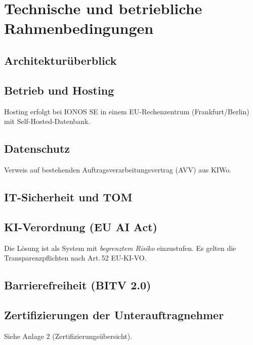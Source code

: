\chapter{Technische und betriebliche Rahmenbedingungen}

\section{Architekturüberblick}


\section{Betrieb und Hosting}

Hosting erfolgt bei IONOS SE in einem EU-Rechenzentrum (Frankfurt/Berlin)
mit Self-Hosted-Datenbank. 

\section{Datenschutz}

Verweis auf bestehenden Auftragsverarbeitungsvertrag (AVV) aus KIWo.

\section{IT-Sicherheit und TOM}


\section{KI-Verordnung (EU AI Act)}

Die Lösung ist als System mit \textit{begrenztem Risiko} einzustufen.
Es gelten die Transparenzpflichten nach Art.\,52 EU-KI-VO.

\section{Barrierefreiheit (BITV 2.0)}


\section{Zertifizierungen der Unterauftragnehmer}

Siehe Anlage 2 (Zertifizierungsübersicht).
